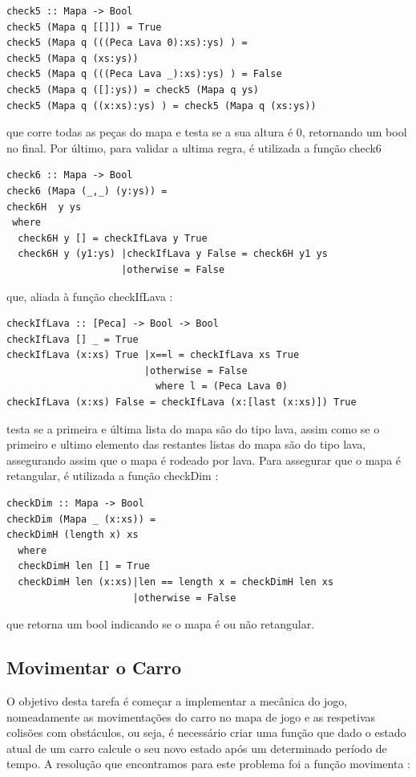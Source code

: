 \documentclass[a4paper]{report} %
\begin{document}
\begin{verbatim}
check5 :: Mapa -> Bool
check5 (Mapa q [[]]) = True
check5 (Mapa q (((Peca Lava 0):xs):ys) ) = 
check5 (Mapa q (xs:ys))
check5 (Mapa q (((Peca Lava _):xs):ys) ) = False
check5 (Mapa q ([]:ys)) = check5 (Mapa q ys)
check5 (Mapa q ((x:xs):ys) ) = check5 (Mapa q (xs:ys))
\end{verbatim}
que corre todas as peças do mapa e testa se a sua altura é 0, retornando um bool no final.
Por último, para validar a ultima regra, é utilizada a função check6
\begin{verbatim}
check6 :: Mapa -> Bool
check6 (Mapa (_,_) (y:ys)) = 
check6H  y ys
 where
  check6H y [] = checkIfLava y True
  check6H y (y1:ys) |checkIfLava y False = check6H y1 ys
                    |otherwise = False
\end{verbatim}
que, aliada à função checkIfLava :

\begin{verbatim}
checkIfLava :: [Peca] -> Bool -> Bool
checkIfLava [] _ = True
checkIfLava (x:xs) True |x==l = checkIfLava xs True
                        |otherwise = False
                          where l = (Peca Lava 0)
checkIfLava (x:xs) False = checkIfLava (x:[last (x:xs)]) True
\end{verbatim} 
testa se a primeira e última lista do mapa são do tipo lava, assim como se o primeiro e ultimo elemento das restantes listas do mapa são do tipo lava, assegurando assim que o mapa é rodeado por lava.
Para assegurar que o mapa é retangular, é utilizada a função checkDim :

\begin{verbatim}
checkDim :: Mapa -> Bool
checkDim (Mapa _ (x:xs)) = 
checkDimH (length x) xs
  where
  checkDimH len [] = True
  checkDimH len (x:xs)|len == length x = checkDimH len xs
                      |otherwise = False
\end{verbatim}
que retorna um bool indicando se o mapa é ou não retangular.






\subsection{Movimentar o Carro}
O objetivo desta tarefa é começar a implementar a mecânica do jogo, nomeadamente as movimentações do carro no mapa de jogo e as respetivas colisões com obstáculos, ou seja, é necessário criar uma função que dado o estado atual de um carro calcule o seu novo estado após um determinado período de tempo.
A resolução que encontramos para este problema foi a função movimenta :
\end{document}
